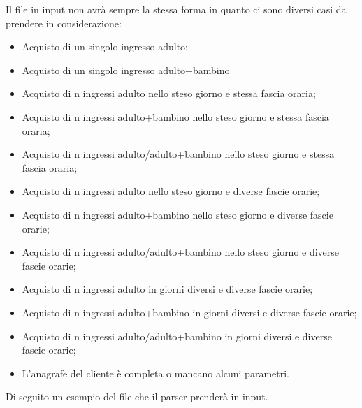 Il file in input non avrà sempre la stessa forma in quanto ci sono diversi casi da prendere in considerazione:
\begin{itemize}
\item Acquisto di un singolo ingresso adulto;
\item Acquisto di un singolo ingresso adulto+bambino
\item Acquisto di n ingressi adulto nello steso giorno e stessa fascia oraria;
\item Acquisto di n ingressi adulto+bambino nello steso giorno e stessa fascia oraria;
\item Acquisto di n ingressi adulto/adulto+bambino nello steso giorno e stessa fascia oraria;

\item Acquisto di n ingressi adulto nello steso giorno e diverse fascie orarie;
\item Acquisto di n ingressi adulto+bambino nello steso giorno e diverse fascie orarie;
\item Acquisto di n ingressi adulto/adulto+bambino nello steso giorno e diverse fascie orarie;

\item Acquisto di n ingressi adulto in giorni diversi e diverse fascie orarie;
\item Acquisto di n ingressi adulto+bambino in giorni diversi e diverse fascie orarie;
\item Acquisto di n ingressi adulto/adulto+bambino in giorni diversi e diverse fascie orarie;

\item L'anagrafe del cliente è completa o mancano alcuni parametri.
\end{itemize}
Di seguito un esempio del file che il parser prenderà in input.
\lstset{frame=single}
